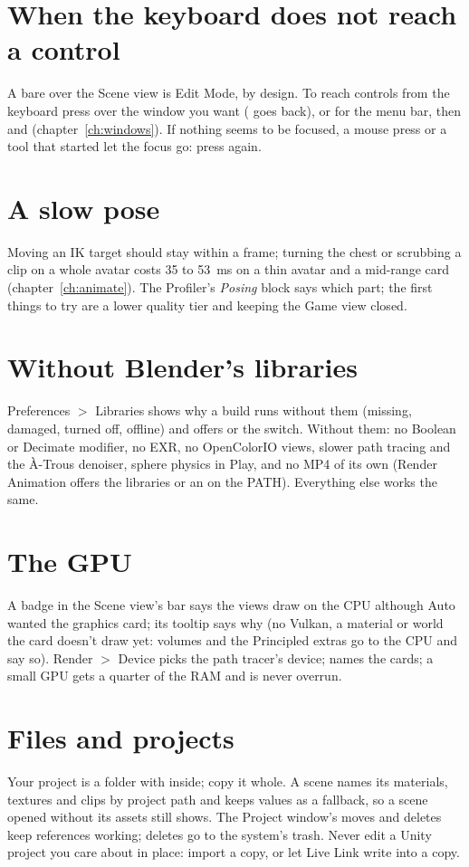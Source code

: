 \section{When the keyboard does not reach a control}
A bare  over the Scene view is Edit Mode, by design. To reach controls from the keyboard press  over the
window you want ( goes back), or  for the menu bar, then  and 
(chapter~\ref{ch:windows}). If nothing seems to be focused, a mouse press or a tool that started let the focus go: press
 again.

\section{A slow pose}
Moving an IK target should stay within a frame; turning the chest or scrubbing a clip on a whole avatar costs 35 to
53~ms on a thin avatar and a mid-range card (chapter~\ref{ch:animate}). The Profiler's \emph{Posing} block says which part;
the first things to try are a lower quality tier and keeping the Game view closed.

\section{Without Blender's libraries}
Preferences $>$ Libraries shows why a build runs without them (missing, damaged, turned off, offline) and offers
 or the switch. Without them: no Boolean or Decimate modifier, no EXR, no OpenColorIO views, slower path
tracing and the \`A-Trous denoiser, sphere physics in Play, and no MP4 of its own (Render Animation offers the
libraries or an  on the PATH). Everything else works the same.

\section{The GPU}
A  badge in the Scene view's bar says the views draw on the CPU although Auto wanted the graphics card; its
tooltip says why (no Vulkan, a material or world the card doesn't draw yet: volumes and the Principled extras go to the
CPU and say so). Render $>$ Device picks the path tracer's device;  names the cards; a small GPU gets a
quarter of the RAM and is never overrun.

\section{Files and projects}
Your project is a folder with  inside; copy it whole. A scene names its materials, textures and clips by
project path and keeps values as a fallback, so a scene opened without its assets still shows. The Project window's
moves and deletes keep references working; deletes go to the system's trash. Never edit a Unity project you care
about in place: import a copy, or let Live Link write into a copy.

